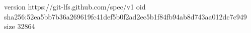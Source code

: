 version https://git-lfs.github.com/spec/v1
oid sha256:52ea5bb7b36a269619fc41def5b0f2ad2ec5b1f84fb94ab8d743aa012dc7c949
size 32864
